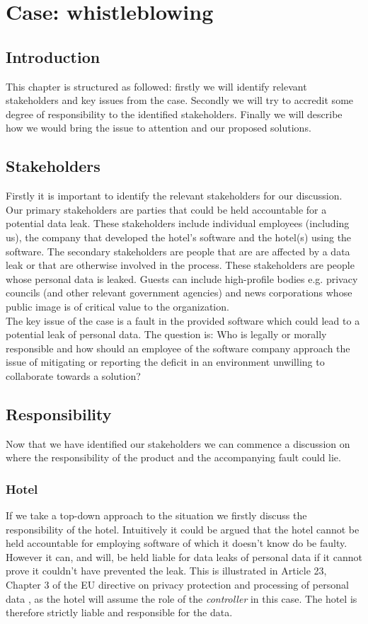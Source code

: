 \chapter{Case: whistleblowing}\label{ch:whistleblowing}
\label{chap:whistleblowing}
\section{Introduction}
This chapter is structured as followed: firstly we will identify relevant stakeholders and key issues from the case. Secondly we will try to accredit some degree of responsibility to the identified stakeholders. Finally we will describe how we would bring the issue to attention and our proposed solutions.

\section{Stakeholders}
Firstly it is important to identify the relevant stakeholders for our discussion. Our primary stakeholders are parties that could be held accountable for a potential data leak. These stakeholders include individual employees (including us), the company that developed the hotel's software and the hotel(s) using the software.  The secondary stakeholders are people that are are affected by a data leak or that are otherwise involved in the process. These stakeholders are people whose personal data is leaked. Guests can include high-profile bodies e.g. privacy councils (and other relevant government agencies) and news corporations whose public image is of critical value to the organization.\\
The key issue of the case is a fault in the provided software which could lead to a potential leak of personal data. The question is: Who is legally or morally responsible and how should an employee of the software company approach the issue of mitigating or reporting the deficit in an environment unwilling to collaborate towards a solution?

\section{Responsibility}
Now that we have identified our stakeholders we can commence a discussion on where the responsibility of the product and the accompanying fault could lie. 

\subsection*{Hotel}
If we take a top-down approach to the situation we firstly discuss the responsibility of the hotel. Intuitively it could be argued that the hotel cannot be held accountable for employing software of which it doesn't know do be faulty. However it can, and will, be held liable for data leaks of personal data if it cannot prove it couldn't have prevented the leak. This is illustrated in Article 23, Chapter 3 of the EU directive on privacy protection and processing of personal data \cite{privacy_directive}, as the hotel will assume the role of the \textit{controller} in this case. The hotel is therefore strictly liable and responsible for the data.

